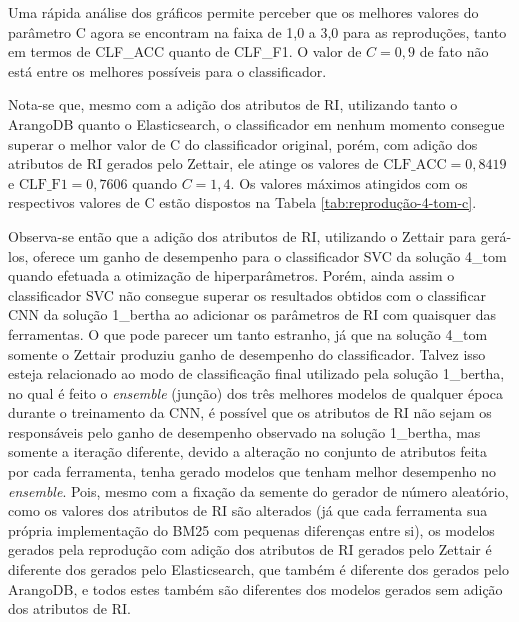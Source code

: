 			

			
			
			Uma rápida análise dos gráficos permite perceber que os melhores valores do parâmetro C agora se encontram na faixa de 1,0 a 3,0 para as reproduções, tanto em termos de CLF\_ACC quanto de CLF\_F1.
			O valor de $C = 0,9$ de fato não está entre os melhores possíveis para o classificador.
			
			Nota-se que, mesmo com a adição dos atributos de RI, utilizando tanto o ArangoDB quanto o Elasticsearch, o classificador em nenhum momento consegue superar o melhor valor de C do classificador original, porém, com adição dos atributos de RI gerados pelo Zettair, ele atinge os valores de $\text{CLF\_ACC} = 0,8419$ e $\text{CLF\_F1} = 0,7606$ quando $C = 1,4$.
			Os valores máximos atingidos com os respectivos valores de C estão dispostos na Tabela \ref{tab:reprodução-4-tom-c}.

			

			Observa-se então que a adição dos atributos de RI, utilizando o Zettair para gerá-los, oferece um ganho de desempenho para o classificador SVC da solução 4\_tom quando efetuada a otimização de hiperparâmetros.
			Porém, ainda assim o classificador SVC não consegue superar os resultados obtidos com o classificar CNN da solução 1\_bertha ao adicionar os parâmetros de RI com quaisquer das ferramentas.
			O que pode parecer um tanto estranho, já que na solução 4\_tom somente o Zettair produziu ganho de desempenho do classificador.
			Talvez isso esteja relacionado ao modo de classificação final utilizado pela solução 1\_bertha, no qual é feito o \textit{ensemble} (junção) dos três melhores modelos de qualquer época durante o treinamento da CNN, é possível que os atributos de RI não sejam os responsáveis pelo ganho de desempenho observado na solução 1\_bertha, mas somente a iteração diferente, devido a alteração no conjunto de atributos feita por cada ferramenta, tenha gerado modelos que tenham melhor desempenho no \textit{ensemble}.
			Pois, mesmo com a fixação da semente do gerador de número aleatório, como os valores dos atributos de RI são alterados (já que cada ferramenta sua própria implementação do BM25 com pequenas diferenças entre si), os modelos gerados pela reprodução com adição dos atributos de RI gerados pelo Zettair é diferente dos gerados pelo Elasticsearch, que também é diferente dos gerados pelo ArangoDB, e todos estes também são diferentes dos modelos gerados sem adição dos atributos de RI.


